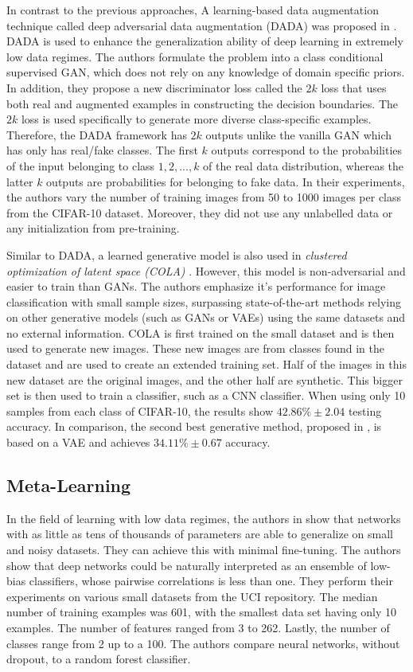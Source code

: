 \documentclass[a4paper,11pt]{article}
\begin{document}
In contrast to the previous approaches, A learning-based data augmentation technique called deep adversarial data augmentation (DADA) was proposed in \cite{zhang2019dada}. DADA is used to enhance the generalization ability of deep learning in extremely low data regimes. The authors formulate the problem into a class conditional supervised GAN, which does not rely on any knowledge of domain specific priors. In addition, they propose a new discriminator loss called the $2k$ loss that uses both real and augmented examples in constructing the decision boundaries. The $2k$ loss is used specifically to generate more diverse class-specific examples. Therefore, the DADA framework has $2k$ outputs unlike the vanilla GAN which has only has real/fake classes. The first $k$ outputs correspond to the probabilities of the input belonging to class $1,2,...,k$ of the real data distribution, whereas the latter $k$ outputs are probabilities for belonging to fake data. In their experiments, the authors vary the number of training images from 50 to 1000 images per class from the CIFAR-10 dataset. Moreover, they did not use any unlabelled data or any initialization from pre-training.

Similar to DADA, a learned generative model is also used in \textit{clustered optimization of latent space (COLA)} \cite{scola}. However, this model is non-adversarial and easier to train than GANs. The authors emphasize it's performance for image classification with small sample sizes, surpassing state-of-the-art methods relying on other generative models (such as GANs or VAEs) using the same datasets and no external information. COLA is first trained on the small dataset and is then used to generate new images. These new images are from classes found in the dataset and are used to create an extended training set. Half of the images in this new dataset are the original images, and the other half are synthetic. This bigger set is then used to train a classifier, such as a CNN classifier. When using only 10 samples from each class of CIFAR-10, the results show $42.86\% \pm 2.04$ testing accuracy. In comparison, the second best generative method, proposed in \cite{cfvae}, is based on a VAE and achieves $34.11\% \pm 0.67$ accuracy.

\subsection{Meta-Learning}
In the field of learning with low data regimes, the authors in \cite{olson2018modern} show that networks with as little as tens of thousands of parameters are able to generalize on small and noisy datasets. They can achieve this with minimal fine-tuning. The authors show that deep networks could be naturally interpreted as an ensemble of low-bias classifiers, whose pairwise correlations is less than one. They perform their experiments on various small datasets from the UCI repository. The median number of training examples was 601, with the smallest data set having only 10 examples. The number of features ranged from 3 to 262. Lastly, the number of classes range from 2 up to a 100. The authors compare neural networks, without dropout, to a random forest classifier.
\end{document}
